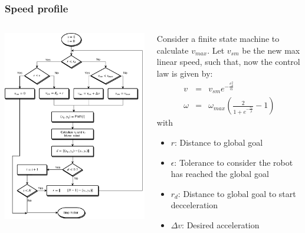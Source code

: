 \begin{frame}\frametitle{Speed profile}
  \begin{columns}
    \begin{column}{0.43\textwidth}
      \includegraphics[width=\textwidth]{Figures/MotionPlanning/AFSM.pdf}
    \end{column}
    \begin{column}{0.5\textwidth}
      Consider a finite state machine to calculate $v_{max}$. Let $v_{sm}$ be the new max linear speed, such that, now the control law is given by:
      \begin{eqnarray*}
        v      &=& v_{sm}e^{-\frac{e_{\theta}^{2}}{\alpha}}\label{eq:NewControl1}\\
        \omega &=& \omega_{max}\left(\frac{2}{1+e^{-\frac{e_{\theta}}{\beta}}}-1\right)\label{eq:NewControl2}
      \end{eqnarray*}
      with
      \begin{itemize}
      \item $r$: Distance to global goal
      \item $\epsilon$: Tolerance to consider the robot has reached the global goal
      \item $r_d$: Distance to global goal to start decceleration
      \item $\Delta v$: Desired acceleration
      \end{itemize}
    \end{column}
  \end{columns}
\end{frame}

